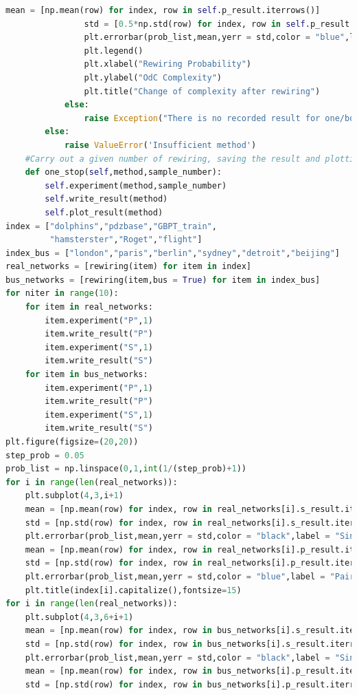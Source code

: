 \documentclass[12pt]{article}
\begin{document}
\begin{lstlisting}[breaklines=true,language=Python]
                mean = [np.mean(row) for index, row in self.p_result.iterrows()]
                std = [0.5*np.std(row) for index, row in self.p_result.iterrows()]
                plt.errorbar(prob_list,mean,yerr = std,color = "blue",label = "Pairwise rewiring")
                plt.legend()
                plt.xlabel("Rewiring Probability")
                plt.ylabel("OdC Complexity")
                plt.title("Change of complexity after rewiring")
            else:
                raise Exception("There is no recorded result for one/both of the methods.")
        else:
            raise ValueError('Insufficient method')
    #Carry out a given number of rewiring, saving the result and plotting at the same time.
    def one_stop(self,method,sample_number):
        self.experiment(method,sample_number)
        self.write_result(method)
        self.plot_result(method)
index = ["dolphins","pdzbase","GBPT_train",
         "hamsterster","Roget","flight"]
index_bus = ["london","paris","berlin","sydney","detroit","beijing"]
real_networks = [rewiring(item) for item in index]
bus_networks = [rewiring(item,bus = True) for item in index_bus]
for niter in range(10):
    for item in real_networks:
        item.experiment("P",1)
        item.write_result("P")
        item.experiment("S",1)
        item.write_result("S")
    for item in bus_networks:
        item.experiment("P",1)
        item.write_result("P")
        item.experiment("S",1)
        item.write_result("S")
plt.figure(figsize=(20,20))
step_prob = 0.05
prob_list = np.linspace(0,1,int(1/(step_prob)+1))
for i in range(len(real_networks)):
    plt.subplot(4,3,i+1)
    mean = [np.mean(row) for index, row in real_networks[i].s_result.iterrows()]
    std = [np.std(row) for index, row in real_networks[i].s_result.iterrows()]
    plt.errorbar(prob_list,mean,yerr = std,color = "black",label = "Single link rewiring")
    mean = [np.mean(row) for index, row in real_networks[i].p_result.iterrows()]
    std = [np.std(row) for index, row in real_networks[i].p_result.iterrows()]
    plt.errorbar(prob_list,mean,yerr = std,color = "blue",label = "Pairwise rewiring")
    plt.title(index[i].capitalize(),fontsize=15)
for i in range(len(real_networks)):
    plt.subplot(4,3,6+i+1)
    mean = [np.mean(row) for index, row in bus_networks[i].s_result.iterrows()]
    std = [np.std(row) for index, row in bus_networks[i].s_result.iterrows()]
    plt.errorbar(prob_list,mean,yerr = std,color = "black",label = "Single link rewiring")
    mean = [np.mean(row) for index, row in bus_networks[i].p_result.iterrows()]
    std = [np.std(row) for index, row in bus_networks[i].p_result.iterrows()]

\end{lstlisting}
\end{document}
